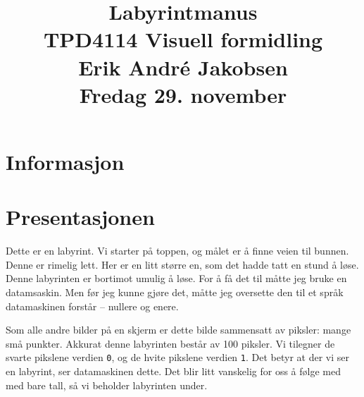 \documentclass{article}
\title{\vspace{-2cm} \textbf{Labyrintmanus}\\[.4em] \large TPD4114 Visuell formidling \\[1em] Erik André Jakobsen \\[.4em] Fredag 29. november \vspace{-1.5cm}}
\date{}
\author
\newcommand{\hl}[2][primary-dark]{\textcolor{#1}{#2}}
\begin{document}
\maketitle

\section*{Informasjon}
\begin{center}
\end{center}

\begin{center}
\end{center}

\section*{Presentasjonen}
Dette er en labyrint. Vi starter på toppen, og målet er å finne veien til bunnen. Denne er rimelig \hl{lett}. \hl{Her} er en litt større en, som det hadde tatt en stund å \hl{løse}. \hl{Denne} labyrinten er bortimot umulig å \hl{løse}. For å få det til måtte jeg bruke en datamsaskin. Men før jeg kunne gjøre det, måtte jeg oversette den til et språk datamaskinen forstår -- \hl{nullere} og enere.

\hl{Som} alle andre bilder på en skjerm er dette bilde sammensatt av \hl{piksler}: mange små punkter. Akkurat denne labyrinten består av 100 piksler. \hl{Vi} tilegner de svarte pikslene verdien \texttt{0}, og de hvite pikslene verdien \texttt{1}. Det betyr at der vi ser en labyrint, ser datamaskinen \hl{dette}. Det blir litt vanskelig for oss å følge med med bare tall, så vi \hl{beholder} labyrinten under.
\end{document}
